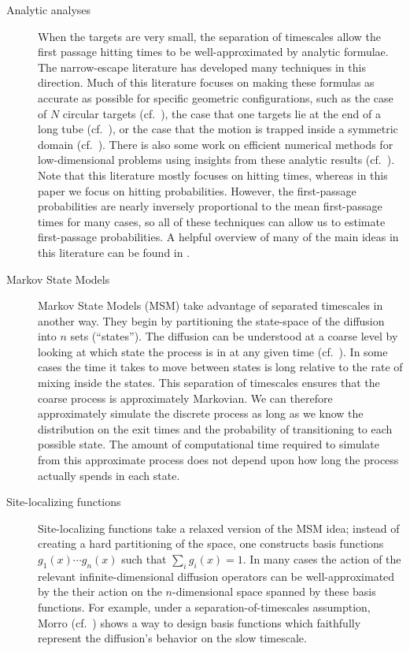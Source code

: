 \documentclass[12pt, nofootinbib,english, amsmath, amssymb, aps, priprint, graphicx,floatfix]{revtex4-1}
\theoremstyle{plain}
\theoremstyle{definition}
\theoremstyle{plain}
\begin{document}
\begin{description}
    \item[Analytic analyses] When the targets are very small, the separation of timescales allow the first passage hitting times to be well-approximated by analytic formulae.  The narrow-escape literature has developed many techniques in this direction.  Much of this literature focuses on making these formulas as accurate as possible for specific geometric configurations, such as the case of $N$ circular targets (cf.\ \cite{cheviakov2010asymptotic}), the case that one targets lie at the end of a long tube (cf.\ \cite{li2014matched}), or the case that the motion is trapped inside a symmetric domain (cf.\ \cite{Chevalier2010-bq,Condamin2006-vi,Coombs2009-pe,Lindsay2017-ds}).  There is also some work on efficient numerical methods for low-dimensional problems using insights from these analytic results (cf.\ \cite{kaye2019fast}).  Note that this literature mostly focuses on hitting times, whereas in this paper we focus on hitting probabilities.   However, the first-passage probabilities are nearly inversely proportional to the mean first-passage times for many cases, so all of these techniques can allow us to estimate first-passage probabilities.  A helpful overview of many of the main ideas in this literature can be found in \cite{Benichou2014-jb}.

    \item[Markov State Models] Markov State Models (MSM) take advantage of separated timescales in another way.  They begin by partitioning the state-space of the diffusion into $n$ sets (``states'').  The diffusion can be understood at a coarse level by looking at which state the process is in at any given time (cf.\ \cite{Pande2010-yi, Chodera2014-bh, Husic2018-xp}).   In some cases the time it takes to move between states is long relative to the rate of mixing inside the states.  This separation of timescales ensures that the coarse process is approximately Markovian.  We can therefore approximately simulate the discrete process as long as we know the distribution on the exit times and the probability of transitioning to each possible state.  The amount of computational time required to simulate from this approximate process does not depend upon how long the process actually spends in each state.

    \item[Site-localizing functions] Site-localizing functions take a relaxed version of the MSM idea; instead of creating a hard partitioning of the space, one constructs basis functions $g_1(x)\cdots g_n(x)$ such that $\sum_i g_i(x)=1$.  In many cases the action of the relevant infinite-dimensional diffusion operators can be well-approximated by the their action on the $n$-dimensional space spanned by these basis functions.   For example, under a separation-of-timescales assumption, Morro (cf.\ \cite{moro1995kinetic}) shows a way to design basis functions which faithfully represent the diffusion's behavior on the slow timescale.


\end{description}
\end{document}
